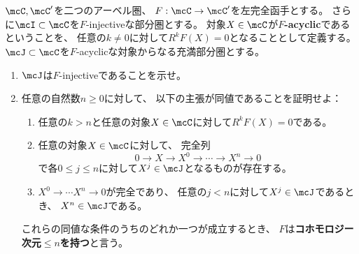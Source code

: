 \documentclass[uplatex,dvipdfmx]{jsarticle}
\begin{document}
\maketitle
\HeaderCommentA
\section{}
\fi


\begin{prob}\label{1.19}
  \(\mcC,\mcC'\)を二つのアーベル圏、
  \(F:\mcC \to \mcC'\)を左完全函手とする。
  さらに\(\mcI\subset \mcC\)を\(F\)-injectiveな部分圏とする。
  対象\(X\in \mcC\)が\textbf{\(F\)-acyclic}であるということを、
  任意の\(k\neq 0\)に対して\(R^kF(X) = 0\)となることとして定義する。
  \(\mcJ\subset \mcC\)を\(F\)-acyclicな対象からなる充満部分圏とする。
  \begin{enumerate}
    \item \label{1.19.1}
    \(\mcJ\)は\(F\)-injectiveであることを示せ。
    \item \label{1.19.2}
    任意の自然数\(n\geq 0\)に対して、
    以下の主張が同値であることを証明せよ：
    \begin{enumerate}
      \item \label{1.19.2.1}
      任意の\(k > n\)と任意の対象\(X\in \mcC\)に対して\(R^kF(X) = 0\)である。
      \item \label{1.19.2.2}
      任意の対象\(X\in \mcC\)に対して、
      完全列
      \[
      0 \to X \to X^0 \to \cdots \to X^n \to 0
      \]
      で各\(0\leq j\leq n\)に対して\(X^j\in \mcJ\)となるものが存在する。
      \item \label{1.19.2.3}
      \(X^0\to \cdots X^n \to 0\)が完全であり、
      任意の\(j < n\)に対して\(X^j\in \mcJ\)であるとき、
      \(X^n\in \mcJ\)である。
    \end{enumerate}
    これらの同値な条件のうちのどれか一つが成立するとき、
    \(F\)は\textbf{コホモロジー次元\(\leq n\)を持つ}と言う。
  \end{enumerate}
\end{prob}
\end{document}
